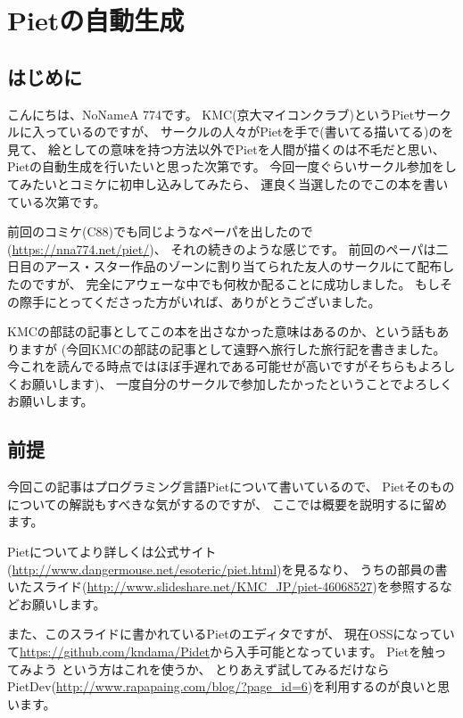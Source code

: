 \chapter[Pietの自動生成]{Pietの自動生成}

\section{はじめに}

こんにちは、NoNameA 774です。
KMC(京大マイコンクラブ)というPietサークルに入っているのですが、
サークルの人々がPietを手で(書いてる\textbar{}描いてる)のを見て、
絵としての意味を持つ方法以外でPietを人間が描くのは不毛だと思い、
Pietの自動生成を行いたいと思った次第です。
今回一度ぐらいサークル参加をしてみたいとコミケに初申し込みしてみたら、
運良く当選したのでこの本を書いている次第です。

前回のコミケ(C88)でも同じようなペーパを出したので(\url{https://nna774.net/piet/})、
それの続きのような感じです。
前回のペーパは二日目のアース・スター作品のゾーンに割り当てられた友人のサークルにて配布したのですが、
完全にアウェーな中でも何枚か配ることに成功しました。
もしその際手にとってくださった方がいれば、ありがとうございました。

KMCの部誌の記事としてこの本を出さなかった意味はあるのか、という話もありますが
(今回KMCの部誌の記事として遠野へ旅行した旅行記を書きました。
今これを読んでる時点ではほぼ手遅れである可能せが高いですがそちらもよろしくお願いします)、
一度自分のサークルで参加したかったということでよろしくお願いします。

\section{前提}

今回この記事はプログラミング言語Pietについて書いているので、
Pietそのものについての解説もすべきな気がするのですが、
ここでは概要を説明するに留めます。

Pietについてより詳しくは公式サイト(\url{http://www.dangermouse.net/esoteric/piet.html})を見るなり、
うちの部員の書いたスライド(\url{http://www.slideshare.net/KMC\_JP/piet-46068527})を参照するなどお願いします。

また、このスライドに書かれているPietのエディタですが、
現在OSSになっていて\url{https://github.com/kndama/Pidet}から入手可能となっています。
Pietを触ってみよう という方はこれを使うか、
とりあえず試してみるだけならPietDev(\url{http://www.rapapaing.com/blog/?page\_id=6})を利用するのが良いと思います。

